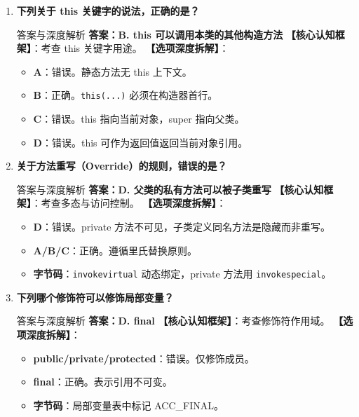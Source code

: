 \documentclass[12pt, a4paper]{ctexart}
\newcommand{\code}[1]{\texttt{\color{myblue}#1}}
\begin{document}
\begin{enumerate}[label=\arabic*.]
	\item \textbf{下列关于 this 关键字的说法，正确的是？}
	      \begin{bluebox}{答案与深度解析}
		      \textbf{答案：B. this 可以调用本类的其他构造方法}
		      \textbf{【核心认知框架】}：考查 this 关键字用途。
		      \textbf{【选项深度拆解】}：
		      \begin{itemize}[leftmargin=*, nosep]
			      \item \textbf{A}：错误。静态方法无 this 上下文。
			      \item \textbf{B}：正确。\code{this(...)} 必须在构造器首行。
			      \item \textbf{C}：错误。this 指向当前对象，super 指向父类。
			      \item \textbf{D}：错误。this 可作为返回值返回当前对象引用。
		      \end{itemize}
	      \end{bluebox}

	\item \textbf{关于方法重写（Override）的规则，错误的是？}
	      \begin{bluebox}{答案与深度解析}
		      \textbf{答案：D. 父类的私有方法可以被子类重写}
		      \textbf{【核心认知框架】}：考查多态与访问控制。
		      \textbf{【选项深度拆解】}：
		      \begin{itemize}[leftmargin=*, nosep]
			      \item \textbf{D}：错误。private 方法不可见，子类定义同名方法是隐藏而非重写。
			      \item \textbf{A/B/C}：正确。遵循里氏替换原则。
			      \item \textbf{字节码}：\code{invokevirtual} 动态绑定，private 方法用 \code{invokespecial}。
		      \end{itemize}
	      \end{bluebox}

	\item \textbf{下列哪个修饰符可以修饰局部变量？}
	      \begin{bluebox}{答案与深度解析}
		      \textbf{答案：D. final}
		      \textbf{【核心认知框架】}：考查修饰符作用域。
		      \textbf{【选项深度拆解】}：
		      \begin{itemize}[leftmargin=*, nosep]
			      \item \textbf{public/private/protected}：错误。仅修饰成员。
			      \item \textbf{final}：正确。表示引用不可变。
			      \item \textbf{字节码}：局部变量表中标记 ACC\_FINAL。
		      \end{itemize}
	      \end{bluebox}


\end{enumerate}
\end{document}
